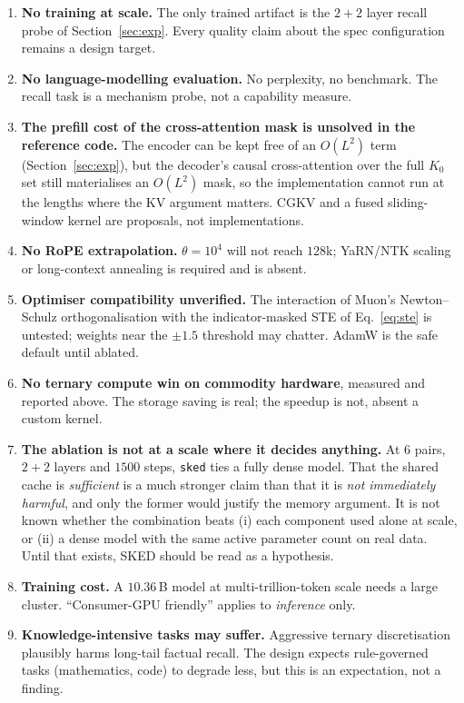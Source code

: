 \documentclass[10pt,conference]{IEEEtran}
\newcommand{\code}[1]{\texttt{\small #1}}
\begin{document}
\begin{enumerate}
\item \textbf{No training at scale.} The only trained artifact is the $2{+}2$ layer
recall probe of Section~\ref{sec:exp}. Every quality claim about the spec configuration
remains a design target.
\item \textbf{No language-modelling evaluation.} No perplexity, no benchmark. The
recall task is a mechanism probe, not a capability measure.
\item \textbf{The prefill cost of the cross-attention mask is unsolved in the reference
code.} The encoder can be kept free of an $O(L^2)$ term (Section~\ref{sec:exp}), but
the decoder's causal cross-attention over the full $K_0$ set still materialises an
$O(L^2)$ mask, so the implementation cannot run at the lengths where the KV argument
matters. CGKV and a fused sliding-window kernel are proposals, not implementations.
\item \textbf{No RoPE extrapolation.} $\theta = 10^4$ will not reach $128$k; YaRN/NTK
scaling or long-context annealing is required and is absent.
\item \textbf{Optimiser compatibility unverified.} The interaction of Muon's
Newton--Schulz orthogonalisation with the indicator-masked STE of Eq.~\ref{eq:ste} is
untested; weights near the $\pm 1.5$ threshold may chatter. AdamW is the safe default
until ablated.
\item \textbf{No ternary compute win on commodity hardware}, measured and reported
above. The storage saving is real; the speedup is not, absent a custom kernel.
\item \textbf{The ablation is not at a scale where it decides anything.} At $6$ pairs,
$2{+}2$ layers and $1500$ steps, \code{sked} ties a fully dense model. That the shared
cache is \emph{sufficient} is a much stronger claim than that it is \emph{not
immediately harmful}, and only the former would justify the memory argument. It is not
known whether the combination beats (i) each component used alone at scale, or (ii) a
dense model with the same active parameter count on real data. Until that exists, SKED
should be read as a hypothesis.
\item \textbf{Training cost.} A $10.36$\,B model at multi-trillion-token scale needs a
large cluster. ``Consumer-GPU friendly'' applies to \emph{inference} only.
\item \textbf{Knowledge-intensive tasks may suffer.} Aggressive ternary discretisation
plausibly harms long-tail factual recall. The design expects rule-governed tasks
(mathematics, code) to degrade less, but this is an expectation, not a finding.
\end{enumerate}
\end{document}

